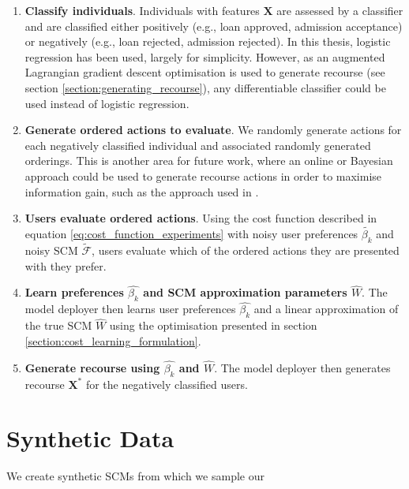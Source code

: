 \begin{enumerate}
	\item \textbf{Classify individuals}. Individuals with features $\mathbf{X}$ are assessed by a classifier and are classified either positively (e.g., loan approved, admission acceptance) or negatively (e.g., loan rejected, admission rejected). In this thesis, logistic regression has been used, largely for simplicity. However, as an augmented Lagrangian gradient descent optimisation is used to generate recourse (see section \ref{section:generating_recourse}), any differentiable classifier could be used instead of logistic regression.
	
	\item \textbf{Generate ordered actions to evaluate}. We randomly generate actions for each negatively classified individual and associated randomly generated orderings. This is another area for future work, where an online or Bayesian approach could be used to generate recourse actions in order to maximise information gain, such as the approach used in \textcite{detoniPersonalizedAlgorithmicRecourse2023}.
	
	\item \textbf{Users evaluate ordered actions}. Using the cost function described in equation \ref{eq:cost_function_experiments} with noisy user preferences $\tilde{\beta_k}$ and noisy SCM $\tilde{\mathcal{F}}$, users evaluate which of the ordered actions they are presented with they prefer. 
	
	\item \textbf{Learn preferences $\hat{\beta_k}$ and SCM approximation parameters $\hat{W}$}. The model deployer then learns user preferences $\hat{\beta_k}$ and a linear approximation of the true SCM $\hat{W}$ using the optimisation presented in section \ref{section:cost_learning_formulation}.
	
	\item \textbf{Generate recourse using $\hat{\beta_k}$ and $\hat{W}$}. The model deployer then generates recourse $\mathbf{X}^*$ for the negatively classified users.
	
\end{enumerate}



\section{Synthetic Data}

We create synthetic SCMs from which we sample our 


